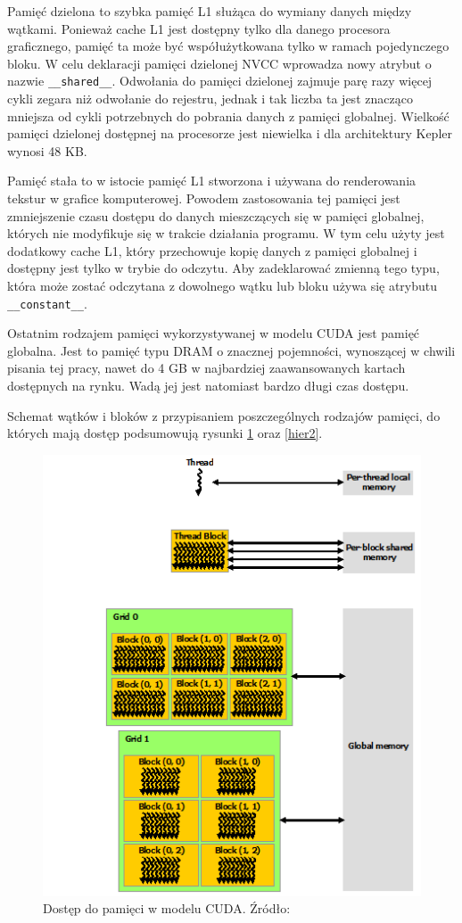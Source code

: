 Pamięć dzielona to szybka pamięć L1 służąca do wymiany danych między wątkami.
Ponieważ cache L1 jest dostępny tylko dla danego procesora graficznego,
  pamięć ta może być współużytkowana tylko w ramach pojedynczego bloku. W celu
  deklaracji pamięci dzielonej NVCC wprowadza nowy atrybut o nazwie
  \texttt{\_\_shared\_\_}. Odwołania do pamięci dzielonej zajmuje parę razy
  więcej cykli zegara niż odwołanie do rejestru, jednak i tak liczba ta jest
  znacząco mniejsza od cykli potrzebnych do pobrania danych z pamięci globalnej.
  Wielkość pamięci dzielonej dostępnej na procesorze jest niewielka i dla
  architektury Kepler wynosi 48 KB.

Pamięć stała to w istocie pamięć L1 stworzona i używana do renderowania tekstur 
w grafice komputerowej. Powodem zastosowania tej pamięci jest zmniejszenie czasu
dostępu do danych mieszczących się w pamięci globalnej, których nie modyfikuje się w trakcie działania programu.
W tym celu użyty jest dodatkowy cache L1, który przechowuje kopię danych 
z pamięci globalnej i dostępny jest tylko w trybie do odczytu.
Aby zadeklarować zmienną tego typu, która może zostać odczytana z dowolnego
wątku lub bloku używa się atrybutu \texttt{\_\_constant\_\_}.

Ostatnim rodzajem pamięci wykorzystywanej w modelu CUDA jest pamięć globalna.
Jest to pamięć typu DRAM o znacznej pojemności, wynoszącej w chwili pisania tej
pracy, nawet do 4 GB w najbardziej zaawansowanych kartach dostępnych na rynku. 
Wadą jej jest natomiast bardzo długi czas dostępu.

Schemat wątków i bloków z przypisaniem poszczególnych rodzajów pamięci, do których
mają dostęp podsumowują rysunki \ref{hier} oraz \ref{hier2}.

\begin{figure}[H]
\centering
\label{hier}
\includegraphics[scale=0.5]{images/memory-hierarchy.png}
\caption{Dostęp do pamięci w modelu CUDA. Źródło: \cite{Nvi11b}}
\end{figure}

